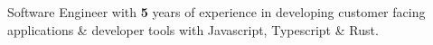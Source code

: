 \documentclass[9pt]{developercv} %
\begin{document}
\vspace{0.5cm}


\cvsect{}

\begin{minipage}[t]{0.4\textwidth} %
	\vspace{-\baselineskip} %
	
	Software Engineer with \textbf{5} years of experience in developing customer facing applications \& developer tools with Javascript, Typescript \& Rust. 
\end{minipage}
\hfill %
\begin{minipage}[t]{0.5\textwidth} %
	\vspace{-\baselineskip} %
\end{minipage}




\end{document}
